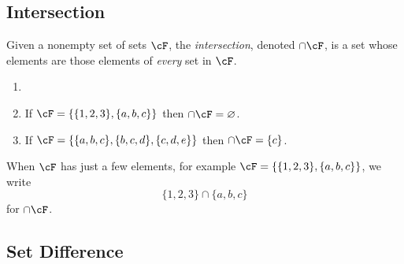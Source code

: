 \documentclass{amsart}
\begin{document}
\subsection{Intersection}
\label{sec:intersection}

\begin{defn}
  Given a nonempty set of sets $\cF$, the \emph{intersection}, denoted $\cap\cF$, is a set whose elements are those elements of \emph{every} set in $\cF$.
\end{defn}

\begin{eg}
  \begin{enumerate}
  \item[]
  \item If $\cF = \{\{1,2,3\},\{a,b,c\}\}$ then $\cap\cF = \varnothing$.
  \item If $\cF = \{\{a,b,c\},\{b,c,d\},\{c,d,e\}\}$ then $\cap\cF = \{c\}$.
  \end{enumerate}
\end{eg}

\begin{notn}
  When $\cF$ has just a few elements, for example $\cF = \{\{1,2,3\},\{a,b,c\}\}$, we write
  \[
    \{1,2,3\} \cap \{a,b,c\}
  \]
  for $\cap\cF$.
\end{notn}

\subsection{Set Difference}
\label{sec:set-difference}
\end{document}
